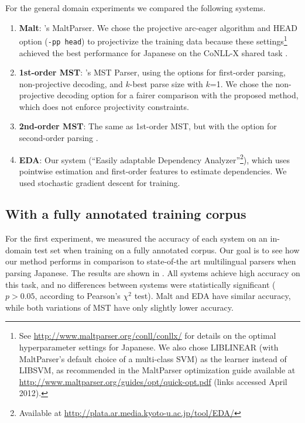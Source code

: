 \documentclass[english]{jnlp_1.4}
\def\tabref#1{}
\begin{document}
For the general domain experiments we compared the following systems.

\begin{enumerate}
\item {\bf Malt}: 's MaltParser. We chose the projective arc-eager
algorithm and {\sc HEAD} option (\texttt{-pp head}) to projectivize the training data because these
  settings\footnote{See \protect\url{http://www.maltparser.org/conll/conllx/} for details on the optimal
hyperparameter settings for Japanese. We also chose LIBLINEAR (with MaltParser's default choice of a
multi-class SVM) as the learner instead of LIBSVM, as recommended in the MaltParser optimization
  guide available at \linebreak\protect\url{http://www.maltparser.org/guides/opt/quick-opt.pdf} (links accessed April
2012).} achieved the best performance for Japanese on the CoNLL-X shared task
\cite{nivre2006labeled}.
\item {\bf 1st-order MST}: 's MST Parser, using the options for first-order
parsing, non-projective decoding, and $k$-best parse size with $k$=1. We chose the non-projective
decoding option for a fairer comparison with the proposed method, which does not enforce
projectivity constraints.
\item {\bf 2nd-order MST}: The same as 1st-order MST, but with the option for second-order parsing \cite{mcdonald2006online}.
\item {\bf EDA}: Our system (``Easily adaptable Dependency Analyzer''\footnote{Available at
  \url{http://plata.ar.media.kyoto-u.ac.jp/tool/EDA/}}), which uses pointwise estimation
  and first-order features to estimate dependencies. We used stochastic gradient descent for
  training.
\end{enumerate}


\subsection{With a fully annotated training corpus}
\label{sec:withFAC}

For the first experiment, we measured the accuracy of each system on an in-domain test set when
training on a fully annotated corpus. Our goal is to see how our method performs in comparison to
state-of-the art multilingual parsers when parsing Japanese. The results are shown in
\tabref{table:result-EHJ}. All systems achieve high accuracy on this task, and no differences
between systems were statistically significant ($p > 0.05$, according to Pearson's $\chi^2$
test). Malt and EDA have similar accuracy, while both variations of MST have only slightly lower
accuracy.
\end{document}
